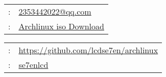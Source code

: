 \begin{minipage}[t]{.5\linewidth}
	\begin{tabular}{rp{.75\linewidth}}
		\baselineskip=20pt
		\email{} : & \href{2353442022@qq.com}{2353442022@qq.com}                                               \\
		\www{}   : & \href{https://mirrors.tuna.tsinghua.edu.cn/archlinux/iso/latest/}{Archlinux iso Download}
	\end{tabular}
\end{minipage}
\begin{minipage}[t]{.5\linewidth}
	\begin{tabular}{rl}
		\gh{}    :    & \href{https://github.com/lcdse7en/archlinux}{https://github.com/lcdse7en/archlinux} \\
		\wechat{}   : & \href{se7enlcd}{se7enlcd}
	\end{tabular}
\end{minipage}
